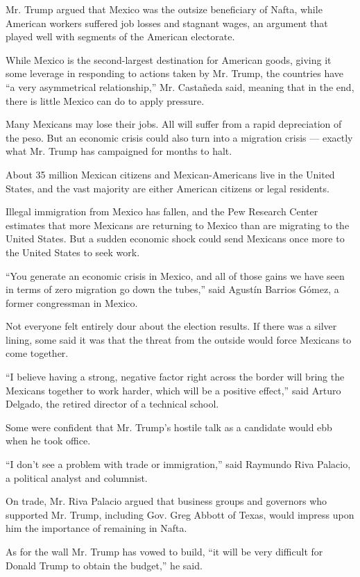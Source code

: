 Mr. Trump argued that Mexico was the outsize beneficiary of Nafta, while
American workers suffered job losses and stagnant wages, an argument
that played well with segments of the American electorate.

While Mexico is the second-largest destination for American goods,
giving it some leverage in responding to actions taken by Mr. Trump, the
countries have ``a very asymmetrical relationship,'' Mr. Castañeda said,
meaning that in the end, there is little Mexico can do to apply
pressure.

Many Mexicans may lose their jobs. All will suffer from a rapid
depreciation of the peso. But an economic crisis could also turn into a
migration crisis --- exactly what Mr. Trump has campaigned for months to
halt.

About 35 million Mexican citizens and Mexican-Americans live in the
United States, and the vast majority are either American citizens or
legal residents.

Illegal immigration from Mexico has fallen, and the Pew Research Center
estimates that more Mexicans are returning to Mexico than are migrating
to the United States. But a sudden economic shock could send Mexicans
once more to the United States to seek work.

``You generate an economic crisis in Mexico, and all of those gains we
have seen in terms of zero migration go down the tubes,'' said Agustín
Barrios Gómez, a former congressman in Mexico.

Not everyone felt entirely dour about the election results. If there was
a silver lining, some said it was that the threat from the outside would
force Mexicans to come together.

``I believe having a strong, negative factor right across the border
will bring the Mexicans together to work harder, which will be a
positive effect,'' said Arturo Delgado, the retired director of a
technical school.

Some were confident that Mr. Trump's hostile talk as a candidate would
ebb when he took office.

``I don't see a problem with trade or immigration,'' said Raymundo Riva
Palacio, a political analyst and columnist.

On trade, Mr. Riva Palacio argued that business groups and governors who
supported Mr. Trump, including Gov. Greg Abbott of Texas, would impress
upon him the importance of remaining in Nafta.

As for the wall Mr. Trump has vowed to build, ``it will be very
difficult for Donald Trump to obtain the budget,'' he said.

